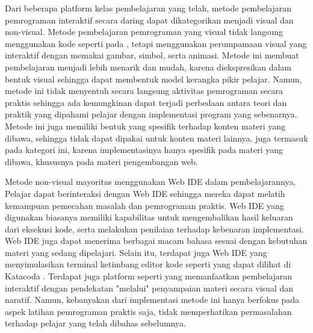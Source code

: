 Dari beberapa platform kelas pembelajaran yang telah, metode pembelajaran pemrograman interaktif secara daring dapat dikategorikan menjadi visual dan non-visual. Metode pembelajaran pemrograman yang visual tidak langsung menggunakan kode seperti pada \textcite{brilliant2021media}, tetapi menggunakan perumpamaan visual yang interaktif dengan memakai gambar, simbol, serta animasi. Metode ini membuat pembelajaran menjadi lebih menarik dan mudah, karena diekspresikan dalam bentuk visual sehingga dapat membentuk model kerangka pikir pelajar. Namun, metode ini tidak menyentuh secara langsung aktivitas pemrograman secara praktis sehingga ada kemungkinan dapat terjadi perbedaan antara teori dan praktik yang dipahami pelajar dengan implementasi program yang sebenarnya. Metode ini juga memiliki bentuk yang spesifik terhadap konten materi yang dibawa, sehingga tidak dapat dipakai untuk konten materi lainnya. \textcite{froggy2021media} juga termasuk pada kategori ini, karena implementasinya hanya spesifik pada materi yang dibawa, khususnya pada materi pengembangan web.

Metode non-visual mayoritas menggunakan Web IDE dalam pembelajarannya. Pelajar dapat berinteraksi dengan Web IDE sehingga mereka dapat melatih kemampuan pemecahan masalah dan pemrograman praktis. Web IDE yang digunakan biasanya memiliki kapabilitas untuk mengembalikan hasil keluaran dari eksekusi kode, serta melakukan penilaian terhadap kebenaran implementasi. Web IDE juga dapat menerima berbagai macam bahasa sesuai dengan kebutuhan materi yang sedang dipelajari. Selain itu, terdapat juga Web IDE yang menyimulasikan terminal ketimbang editor kode seperti yang dapat dilihat di Katacoda \parencite{katacoda2021media}. Terdapat juga platform seperti \textcite{progate2021media} yang memanfaatkan pembelajaran interaktif dengan pendekatan "melalui" penyampaian materi secara visual dan naratif. Namun, kebanyakan dari implementasi metode ini hanya berfokus pada aspek latihan pemrograman praktis saja, tidak memperhatikan permasalahan terhadap pelajar yang telah dibahas sebelumnya.

